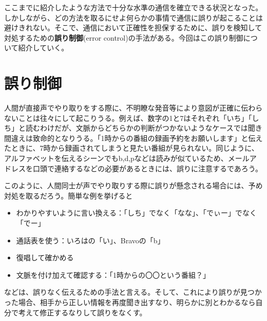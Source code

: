 ここまでに紹介したような方法で十分な水準の通信を確立できる状況となった。しかしながら、どの方法を取るにせよ何らかの事情で通信に誤りが起こることは避けきれない。そこで、通信において正確性を担保するために、誤りを検知して対処するための\textbf{誤り制御}(error control)の手法がある。今回はこの誤り制御について紹介していく。

\section{誤り制御}

人間が直接声でやり取りをする際に、不明瞭な発音等により意図が正確に伝わらないことは往々にして起こりうる。例えば、数字の1と7はそれぞれ「いち」「しち」と読むわけだが、文脈からどちらかの判断がつかないようなケースでは聞き間違えは致命的となりうる。「1時からの番組の録画予約をお願いします」と伝えたときに、7時から録画されてしまうと見たい番組が見られない。同じように、アルファベットを伝えるシーンでもb,d,pなどは読みが似ているため、メールアドレスを口頭で連絡するなどの必要があるときには、誤りに注意するであろう。

このように、人間同士が声でやり取りする際に誤りが懸念される場合には、予め対処を取るだろう。簡単な例を挙げると
\begin{itemize}
\item わかりやすいように言い換える：「しち」でなく「なな」、「でぃー」でなく「でー」
\item 通話表を使う：いろはの「い」、Bravoの「b」
\item 復唱して確かめる
\item 文脈を付け加えて確認する：「1時からの〇〇という番組？」
\end{itemize}
などは、誤りなく伝えるための手法と言える。そして、これにより誤りが見つかった場合、相手から正しい情報を再度聞き出すなり、明らかに別とわかるなら自分で考えて修正するなりして誤りをなくす。

